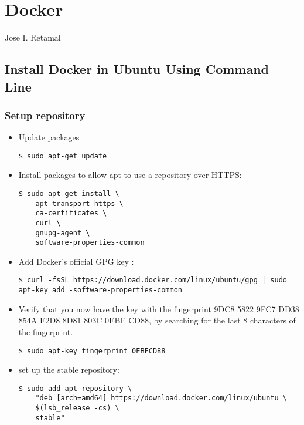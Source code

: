 \chapter{Docker}
Jose I. Retamal
\vskip 0.1in
\indent
\indent
  
\section{Install Docker in Ubuntu Using Command Line}	
  	
  
\subsection{Setup repository}
\begin{itemize}
\item Update packages 
	
\begin{verbatim}
$ sudo apt-get update
\end{verbatim}

\item Install packages to allow apt to use a repository over HTTPS:

\begin{verbatim}
$ sudo apt-get install \
	apt-transport-https \
	ca-certificates \
	curl \
	gnupg-agent \
	software-properties-common
\end{verbatim}

\item Add Docker’s official GPG key :
\begin{verbatim}
$ curl -fsSL https://download.docker.com/linux/ubuntu/gpg | sudo apt-key add -software-properties-common
\end{verbatim}


\item Verify that you now have the key with the fingerprint 9DC8 5822 9FC7 DD38 854A E2D8 8D81 803C 0EBF CD88, by searching for the last 8 characters of the fingerprint.
\begin{verbatim}
$ sudo apt-key fingerprint 0EBFCD88
\end{verbatim}


\item set up the stable repository:
\begin{verbatim}
$ sudo add-apt-repository \
	"deb [arch=amd64] https://download.docker.com/linux/ubuntu \
	$(lsb_release -cs) \
	stable"
\end{verbatim}

\end{itemize}

